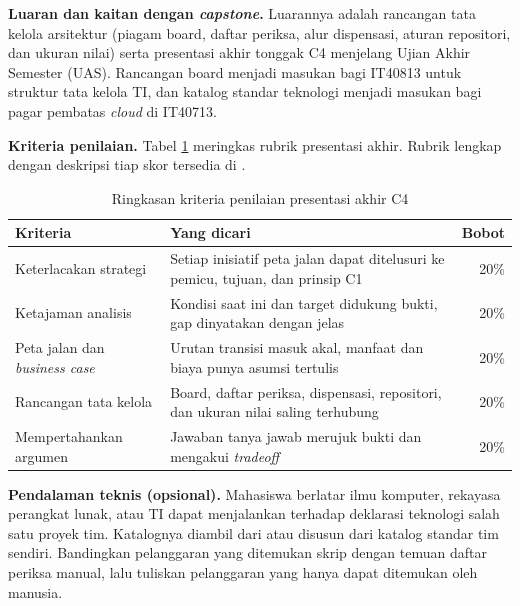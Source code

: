 \textbf{Luaran dan kaitan dengan \textit{capstone}.} Luarannya adalah
rancangan tata kelola arsitektur (piagam board, daftar periksa, alur
dispensasi, aturan repositori, dan ukuran nilai) serta presentasi akhir
tonggak C4 menjelang Ujian Akhir Semester (UAS). Rancangan board menjadi
masukan bagi IT40813 untuk struktur tata kelola TI, dan katalog standar
teknologi menjadi masukan bagi pagar pembatas \textit{cloud} di IT40713.

\textbf{Kriteria penilaian.} Tabel \ref{tab:ch14-rubrik} meringkas rubrik
presentasi akhir. Rubrik lengkap dengan deskripsi tiap skor tersedia di
.

\begin{table}[!htb]
  \centering
  \caption{Ringkasan kriteria penilaian presentasi akhir C4}
  \label{tab:ch14-rubrik}
  \begin{tabularx}{\textwidth}{>{\raggedright\arraybackslash}X>{\raggedright\arraybackslash}X r}
    \hline
    \textbf{Kriteria} & \textbf{Yang dicari} & \textbf{Bobot} \\
    \hline
    Keterlacakan strategi & Setiap inisiatif peta jalan dapat ditelusuri ke
      pemicu, tujuan, dan prinsip C1 & 20\% \\
    \hline
    Ketajaman analisis & Kondisi saat ini dan target didukung bukti, gap
      dinyatakan dengan jelas & 20\% \\
    \hline
    Peta jalan dan \textit{business case} & Urutan transisi masuk akal,
      manfaat dan biaya punya asumsi tertulis & 20\% \\
    \hline
    Rancangan tata kelola & Board, daftar periksa, dispensasi, repositori,
      dan ukuran nilai saling terhubung & 20\% \\
    \hline
    Mempertahankan argumen & Jawaban tanya jawab merujuk bukti dan mengakui
      \textit{tradeoff} & 20\% \\
    \hline
  \end{tabularx}
\end{table}

\textbf{Pendalaman teknis (opsional).} Mahasiswa berlatar ilmu komputer,
rekayasa perangkat lunak, atau TI dapat menjalankan
 terhadap deklarasi
teknologi salah satu proyek tim. Katalognya diambil dari
 atau disusun dari
katalog standar tim sendiri. Bandingkan pelanggaran yang ditemukan skrip
dengan temuan daftar periksa manual, lalu tuliskan pelanggaran yang hanya
dapat ditemukan oleh manusia.

